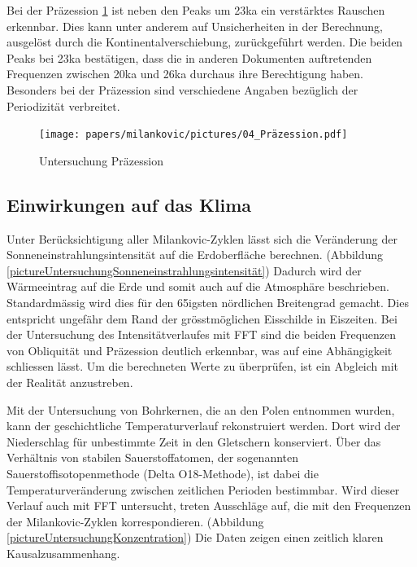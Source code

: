 Bei der Präzession
\ref{pictureUntersuchungPräzession}
ist neben den Peaks um 23ka ein verstärktes Rauschen erkennbar.
Dies kann unter anderem auf Unsicherheiten in der Berechnung, ausgelöst durch die Kontinentalverschiebung, zurückgeführt werden.
Die beiden Peaks bei 23ka bestätigen, dass die in anderen Dokumenten auftretenden Frequenzen zwischen 20ka und 26ka durchaus ihre Berechtigung haben.
Besonders bei der Präzession sind verschiedene Angaben bezüglich der Periodizität verbreitet.


\begin{figure}
	\centering
	\texttt{[image: papers/milankovic/pictures/04\_Präzession.pdf]}
	\caption{Untersuchung Präzession
		\label{pictureUntersuchungPräzession}}
\end{figure}

\subsection{Einwirkungen auf das Klima
\label{milankovic:subsection:EinwirkungenKlima}}
Unter Berücksichtigung aller Milankovic-Zyklen lässt sich die Veränderung der Sonneneinstrahlungsintensität auf die Erdoberfläche berechnen.
(Abbildung \ref{pictureUntersuchungSonneneinstrahlungsintensität})
Dadurch wird der Wärmeeintrag auf die Erde und somit auch auf die Atmosphäre beschrieben. Standardmässig wird dies für den 65igsten nördlichen Breitengrad gemacht.
Dies entspricht ungefähr dem Rand der grösstmöglichen Eisschilde in Eiszeiten.
Bei der Untersuchung des Intensitätverlaufes mit FFT sind die beiden Frequenzen von Obliquität und Präzession deutlich erkennbar, was auf eine Abhängigkeit schliessen lässt.
Um die berechneten Werte zu überprüfen, ist ein Abgleich mit der Realität anzustreben.

Mit der Untersuchung von Bohrkernen, die an den Polen entnommen wurden, kann der geschichtliche Temperaturverlauf rekonstruiert werden.
Dort wird der Niederschlag für unbestimmte Zeit in den Gletschern konserviert. Über das Verhältnis von stabilen Sauerstoffatomen, der sogenannten Sauerstoffisotopenmethode (Delta O18-Methode), ist dabei die Temperaturveränderung zwischen zeitlichen Perioden bestimmbar.
Wird dieser Verlauf auch mit FFT untersucht, treten Ausschläge auf, die mit den Frequenzen der Milankovic-Zyklen korrespondieren.
(Abbildung \ref{pictureUntersuchungKonzentration})
Die Daten zeigen einen zeitlich klaren Kausalzusammenhang.

